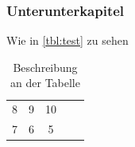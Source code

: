 \documentclass[
a4paper,   
titlepage,  
halfparskip,
12pt        
]{scrartcl}
\begin{document}
\begin{onehalfspacing}
\subsubsection{Unterunterkapitel}
\label{subsubsec:kap}
Wie in \autoref{tbl:test} zu sehen
\begin{table}[h]
\centering
  \begin{tabular}{ l | c | c | c | r }
  \hline
  8 & 9 & 10 \\
  7 & 6 & 5 \\
  \hline
  \end{tabular}
\caption[Beschreibung im Verzeichnis]{Beschreibung an der Tabelle\footnotemark}\label{tbl:test}
\end{table}


\appendix

\newpage


\end{onehalfspacing}
\end{document}

